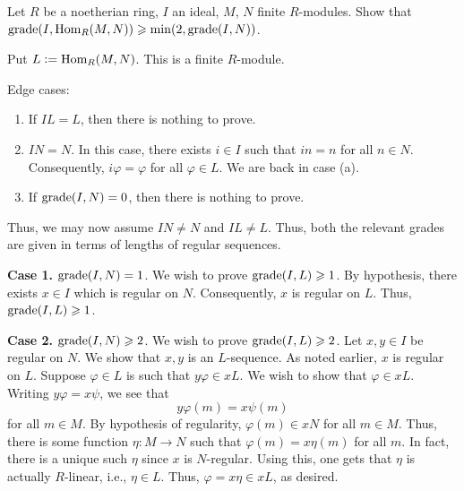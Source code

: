 \documentclass[12pt]{article}
\begin{document}
\begin{exe} \label{exe:grade-Hom-min-2-grade}
	Let $R$ be a noetherian ring, $I$ an ideal, $M$, $N$ finite $R$-modules. Show that $\operatorname{grade}(I, \operatorname{Hom}_{R}(M, N)) \geqslant \min(2, \operatorname{grade}(I, N))$.
\end{exe}
\begin{soln}
	Put $L \vcentcolon= \operatorname{Hom}_{R}(M, N)$. This is a finite $R$-module.

	Edge cases: 
	\begin{enumerate}[label=(\alph*)]
		\item If $IL = L$, then there is nothing to prove.
		\item $IN = N$. In this case, there exists $i \in I$ such that $in = n$ for all $n \in N$. \newline
		Consequently, $i \varphi = \varphi$ for all $\varphi \in L$. We are back in case (a).
		\item If $\operatorname{grade}(I, N) = 0$, then there is nothing to prove.
	\end{enumerate}

	Thus, we may now assume $IN \neq N$ and $IL \neq L$. Thus, both the relevant grades are given in terms of lengths of regular sequences.

	\textbf{Case 1.} $\operatorname{grade}(I, N) = 1$. We wish to prove $\operatorname{grade}(I, L) \geqslant 1$. \newline
	By hypothesis, there exists $x \in I$ which is regular on $N$. Consequently, $x$ is regular on $L$. Thus, $\operatorname{grade}(I, L) \geqslant 1$.

	\textbf{Case 2.} $\operatorname{grade}(I, N) \geqslant 2$. We wish to prove $\operatorname{grade}(I, L) \geqslant 2$. \newline
	Let $x, y \in I$ be regular on $N$. We show that $x, y$ is an $L$-sequence. As noted earlier, $x$ is regular on $L$. Suppose $\varphi \in L$ is such that $y \varphi \in x L$. We wish to show that $\varphi \in x L$. \newline
	Writing $y \varphi = x \psi$, we see that
	\begin{equation*} 
		y \varphi(m) = x \psi(m)
	\end{equation*}
	for all $m \in M$. By hypothesis of regularity, $\varphi(m) \in x N$ for all $m \in M$. \newline
	Thus, there is some function $\eta : M \to N$ such that $\varphi(m) = x \eta(m)$ for all $m$. \newline
	In fact, there is a unique such $\eta$ since $x$ is $N$-regular. Using this, one gets that $\eta$ is actually $R$-linear, i.e., $\eta \in L$. \newline
	Thus, $\varphi = x \eta \in x L$, as desired.
\end{soln}
\end{document}
